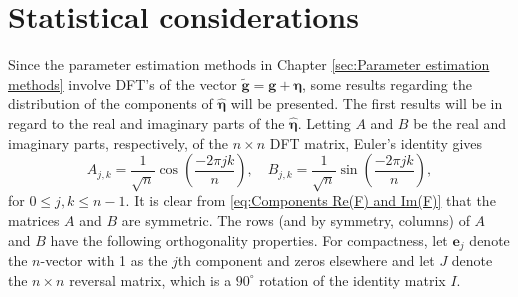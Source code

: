 \documentclass[12pt]{book}
\newcommand{\gVec}{\mathbf{g}}	%
\newcommand{\gnoiseVec}{\widetilde{\mathbf{g}}}	%
\newcommand{\noise}{\eta}	%
\newcommand{\noiseVec}{\bm{\noise}}	%
\begin{document}
\chapter{Statistical considerations} \label{sec:Stats.}

Since the parameter estimation methods in Chapter \ref{sec:Parameter estimation methods} involve DFT's of the vector $\gnoiseVec = \gVec + \noiseVec$, some results regarding the distribution of the components of $\widehat{\noiseVec}$ will be presented. The first results will be in regard to the real and imaginary parts of the $\widehat{\noiseVec}$. Letting $A$ and $B$ be the real and imaginary parts, respectively, of the $n \times n$ DFT matrix, Euler's identity gives
\begin{equation}
A_{j,k} = \frac{1}{\sqrt{n}}\cos\left(\frac{-2\pi{jk}}{n}\right), \quad B_{j,k} = \frac{1}{\sqrt{n}}\sin\left(\frac{-2\pi{jk}}{n}\right),
\label{eq:Components Re(F) and Im(F)}
\end{equation}
for $0 \leq j,k \leq n-1$. It is clear from \eqref{eq:Components Re(F) and Im(F)} that the matrices $A$ and $B$ are symmetric. The rows (and by symmetry, columns) of $A$ and $B$ have the following orthogonality properties. For compactness, let $\mathbf{e}_j$ denote the $n$-vector with 1 as the $j$th component and zeros elsewhere and let $J$ denote the $n \times n$ reversal matrix, which is a $90^\circ$ rotation of the identity matrix $I$.
\end{document}

